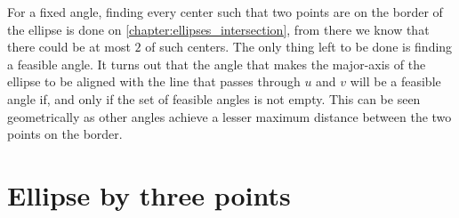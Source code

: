 For a fixed angle, finding every center such that two points are on the border of the ellipse is done on \autoref{chapter:ellipses_intersection}, from there we know that there could be at most $2$ of such centers. The only thing left to be done is finding a feasible angle. It turns out that the angle that makes the major-axis of the ellipse to be aligned with the line that passes through $u$ and $v$ will be a feasible angle if, and only if the set of feasible angles is not empty. This can be seen geometrically as other angles achieve a lesser maximum distance between the two points on the border.

\section{Ellipse by three points}


